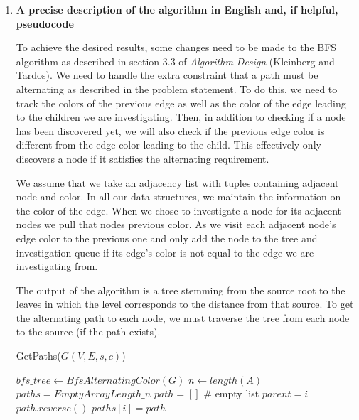 \documentclass[letterpaper,11pt]{article}
\begin{document}
\begin{enumerate}
    \color{teal}
    \item \textbf{A precise description of the algorithm in English and, if helpful, pseudocode}

        To achieve the desired results, some changes need to be made to the BFS 
        algorithm as described in section 3.3 of \textit{Algorithm Design} 
        (Kleinberg and Tardos). We need to handle the extra constraint that a 
        path must be alternating as described in the problem statement. To do
        this, we need to track the colors of the previous edge  as well as the
        color of the edge leading to the children we are investigating. Then, 
        in addition to checking if a node has been discovered yet, we will also 
        check if the previous edge color is different from the edge color 
        leading to the child. This effectively only discovers a node if it 
        satisfies the alternating requirement.

        We assume that we take an adjacency list with tuples 
        containing adjacent node and color. In all our data structures, we 
        maintain the information on the color of the edge. When we chose to 
        investigate a node for its adjacent nodes we pull that nodes previous
        color. As we visit each adjacent node's edge color to the previous one
        and only add the node to the tree and investigation queue if its edge's 
        color is not equal to the edge we are investigating from.
        
        The output of the algorithm is a tree stemming from the source root to 
        the leaves in which the level corresponds to the distance from that 
        source. To get the alternating path to each node, we must traverse the 
        tree from each node to the source (if the path exists).

        \begin{algorithm}[H]
            \label{alg:test}
            \caption{GetPaths($G\left( V, E, s, c \right)$)} 
            $bfs\_tree \gets BfsAlternatingColor\left( G \right) $ \;
            $n \gets length(A)$ \;
            $paths =  Empty Array Length\_n$ \;
            {
                $path = [] $ \# empty list
                $parent = i$ \;
                $path.reverse()$ \;
                $paths[i] = path$ \;
            }
        \end{algorithm}



\end{enumerate}
\end{document}
